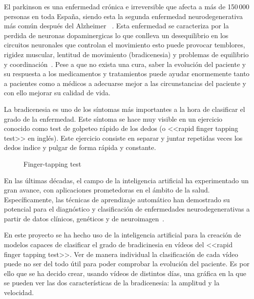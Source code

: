 
El parkinson es una enfermedad crónica e irreversible que afecta a más de 150\,000 personas en toda España, siendo esta la segunda enfermedad neurodegenerativa más común después del Alzheimer ~\cite{brainsci11081027}. Esta enfermedad se caracteriza por la perdida de neuronas dopaminergicas lo que conlleva un desequilibrio en los circuitos neuronales que controlan el movimiento esto puede provocar temblores, rigidez muscular, lentitud de movimiento (bradicenesia) y problemas de equilibrio y coordinación~\cite{Poewe_Seppi_Tanner_Halliday_Brundin_Volkmann_Schrag_Lang_2017}.
Pese a que no exista una cura, saber la evolución del paciente y su respuesta a los medicamentos y tratamientos puede ayudar enormemente tanto a pacientes como a médicos a adecuarse mejor a las circunstancias del paciente y con ello mejorar su calidad de vida.
 
La bradicenesia es uno de los síntomas más importantes a la hora de clasificar el grado de la enfermedad. Este síntoma se hace muy visible en un ejercicio conocido como test de golpeteo rápido de los dedos (o <<rapid finger tapping test>> en inglés). Este ejercicio consiste en separar y juntar repetidas veces los dedos indice y pulgar de forma rápida y constante.


\begin{figure}
    \centering
    \caption{Finger-tapping test}
    \label{fig:finger-tapping-test}
\end{figure}

En las últimas décadas, el campo de la inteligencia artificial ha experimentado un gran avance, con aplicaciones prometedoras en el ámbito de la salud. Específicamente, las técnicas de aprendizaje automático han demostrado su potencial para el diagnóstico y clasificación de enfermedades neurodegenerativas a partir de datos clínicos, genéticos y de neuroimagen~\cite{CardiacCare}.

En este proyecto se ha hecho uso de la inteligencia artificial para la creación de modelos capaces de clasificar el grado de bradicinesia en vídeos del <<rapid finger tapping test>>. Ver de manera individual la clasificación de cada vídeo puede no ser del todo útil para poder comprobar la evolución del paciente. Es por ello que se ha decido crear, usando vídeos de distintos días, una gráfica en la que se pueden ver las dos características de la bradicenesia: la amplitud y la velocidad. 